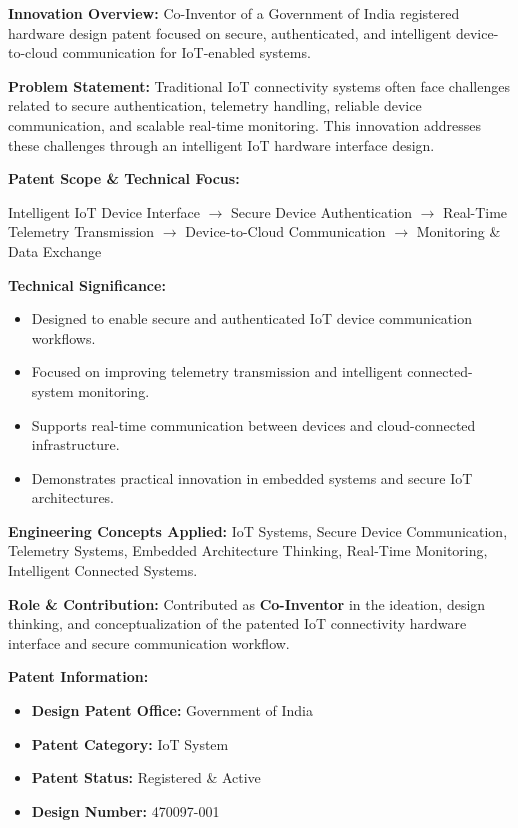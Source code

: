 \documentclass[a4paper,11pt]{article}
\begin{document}
\textbf{Innovation Overview:}
Co-Inventor of a Government of India registered hardware design patent focused on secure, authenticated, and intelligent device-to-cloud communication for IoT-enabled systems.

\textbf{Problem Statement:}
Traditional IoT connectivity systems often face challenges related to secure authentication, telemetry handling, reliable device communication, and scalable real-time monitoring. This innovation addresses these challenges through an intelligent IoT hardware interface design.

\textbf{Patent Scope \& Technical Focus:}

Intelligent IoT Device Interface
$\rightarrow$ Secure Device Authentication
$\rightarrow$ Real-Time Telemetry Transmission
$\rightarrow$ Device-to-Cloud Communication
$\rightarrow$ Monitoring \& Data Exchange

\textbf{Technical Significance:}
\begin{itemize}

    \item Designed to enable secure and authenticated IoT device communication workflows.

    \item Focused on improving telemetry transmission and intelligent connected-system monitoring.

    \item Supports real-time communication between devices and cloud-connected infrastructure.

    \item Demonstrates practical innovation in embedded systems and secure IoT architectures.

\end{itemize}

\textbf{Engineering Concepts Applied:}
IoT Systems, Secure Device Communication, Telemetry Systems, Embedded Architecture Thinking, Real-Time Monitoring, Intelligent Connected Systems.

\textbf{Role \& Contribution:}
Contributed as \textbf{Co-Inventor} in the ideation, design thinking, and conceptualization of the patented IoT connectivity hardware interface and secure communication workflow.

\textbf{Patent Information:}
\begin{itemize}
    \item \textbf{Design Patent Office:} Government of India
    
    \item \textbf{Patent Category:} IoT System
    
    \item \textbf{Patent Status:} Registered \& Active
    
    \item \textbf{Design Number:} 470097-001
\end{itemize}
\end{document}
